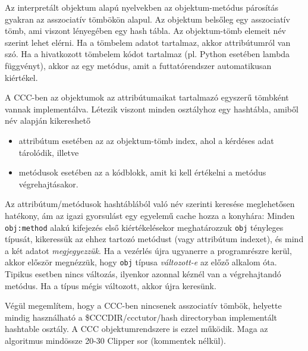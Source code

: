 Az interpretált objektum alapú nyelvekben az objektum-metódus 
párosítás gyakran az asszociatív tömbökön alapul. Az objektum belsőleg
egy asszociatív tömb, ami viszont lényegében egy hash tábla. 
Az objektum-tömb elemeit név szerint lehet elérni. 
Ha a tömbelem adatot tartalmaz, akkor attribútumról van szó. 
Ha a hivatkozott tömbelem kódot tartalmaz 
(pl. Python esetében lambda függvényt), akkor az egy metódus,
amit a futtatórendszer automatikusan kiértékel.

A CCC-ben az objektumok az attribútumaikat tartalmazó egyszerű tömbként 
vannak implementálva.  Létezik viszont minden osztályhoz egy hashtábla,
amiből név alapján kikereshető
\begin{itemize}
\item attribútum esetében az az objektum-tömb index, 
      ahol a kérdéses adat tárolódik, illetve 
\item metódusok esetében az a kódblokk, 
      amit ki kell értékelni a metódus végrehajtásakor.
\end{itemize}

Az attribútum/metódusok hashtáblából való név szerinti keresése 
meglehetősen hatékony, ám az igazi gyorsulást egy  egyelemű
cache  hozza a konyhára:
Minden \verb!obj:method! alakú kifejezés
első kiértékelésekor meghatározzuk \verb!obj! tényleges típusát, 
kikeressük az ehhez tartozó metódust (vagy attribútum indexet), 
és mind a két adatot {\em megjegyezzük}.
Ha a vezérlés újra ugyanerre a programrészre kerül, akkor először
megnézzük, hogy \verb!obj! típusa {\em változott-e} az előző alkalom óta.
Tipikus esetben nincs változás, ilyenkor azonnal kéznél
van a végrehajtandó metódus. Ha a típus mégis változott,
akkor újra keresünk.

Végül megemlítem, hogy a CCC-ben nincsenek asszociatív tömbök,
helyette mindig használható a \$CCCDIR/ccctutor/hash directoryban
implementált hashtable osztály. A CCC objektumrendszere is ezzel működik.
Maga az algoritmus mindössze 20-30 Clipper sor (kommentek nélkül).



